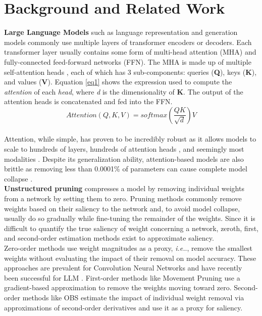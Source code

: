 \documentclass[10pt]{article}
\begin{document}
\section{Background and Related Work}
\textbf{Large Language Models} such as language representation and generation models commonly use multiple layers of transformer encoders or decoders. Each transformer layer usually contains some form of multi-head attention (MHA) and fully-connected feed-forward networks (FFN). The MHA is made up of multiple self-attention heads \cite{Vaswani2017AttentionIA}, each of which has 3 sub-components: queries (\textbf{Q}), keys (\textbf{K}), and values (\textbf{V}). Equation \ref{eq1} shows the expression used to compute the \textit{attention} of each \textit{head}, where \textit{d} is the dimensionality of \textbf{K}. The output of the attention heads is concatenated and fed into the FFN. 
\begin{equation}
 Attention(Q,K,V) = \textit{softmax} \left(\frac{QK}{\sqrt{\textit{d}}}\right)V
  \label{eq1}
 \end{equation} \\
Attention, while simple, has proven to be incredibly robust as it allows models to scale to hundreds of layers, hundreds of attention heads \cite{Brown2020LanguageMA}, and seemingly most modalities \cite{Chen2021CrossViTCM} \cite{Arnab2021ViViTAV}. Despite its generalization ability, attention-based models are also brittle as removing less than 0.0001\% of parameters can cause complete model collapse \cite{Kovaleva2021BERTBO}.  \\
\textbf{Unstructured pruning} compresses a model by removing individual weights from a network by setting them to zero. Pruning methods commonly remove weights based on their saliency to the network and, to avoid model collapse, usually do so gradually while fine-tuning the remainder of the weights. Since it is difficult to quantify the true saliency of weight concerning a network, zeroth, first, and second-order estimation methods exist to approximate saliency.\\
Zero-order methods use weight magnitudes as a proxy,  \textit{i.e.}., remove the smallest weights without evaluating the impact of their removal on model accuracy. These approaches are prevalent for Convolution Neural Networks \cite{Han2015ADN} and have recently been successful for LLM \cite{Gordon2020CompressingBS} \cite{Chen2020TheLT} \cite{Zafrir2021PruneOF}. First-order methods like Movement Pruning \cite{Sanh2020MovementPA} use a gradient-based approximation to remove the weights moving toward zero. Second-order methods like OBS \cite{Singh2020WoodFisherES} estimate the impact of individual weight removal via approximations of second-order derivatives and use it as a proxy for saliency.\\
\end{document}

